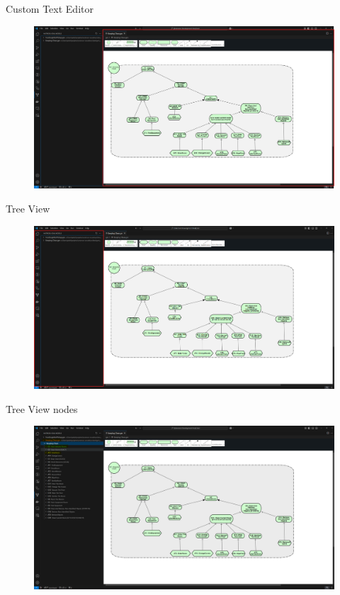 \documentclass{beamer}
\begin{document}
\begin{frame}{Custom Text Editor}
  \begin{figure}[!h]
    \centering
    \includegraphics[width=1\textwidth]{custom_texteditor.png} 
    \caption{}
  \end{figure}
\end{frame}
\begin{frame}{Tree View}
  \begin{figure}[!h]
    \centering
    \includegraphics[width=1\textwidth]{treeview.png} 
    \caption{}
  \end{figure}
\end{frame}
\begin{frame}{Tree View nodes}
  \begin{figure}[!h]
    \centering
    \includegraphics[width=1\textwidth]{Mission in treeview.png} 
    \caption{}
  \end{figure}
\end{frame}
\end{document}
